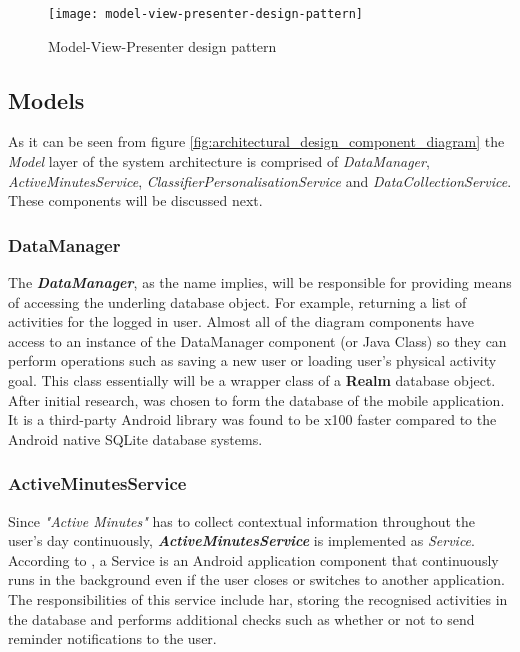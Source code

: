    \begin{figure}[ht]
        \centering
        \texttt{[image: model-view-presenter-design-pattern]}
        \caption{Model-View-Presenter design pattern \citep[28]{syromiatnikov2014}}
        \label{fig:model_view_presenter_design_pattern}
    \end{figure}
        
        \subsection{Models}
        As it can be seen from figure \ref{fig:architectural_design_component_diagram} the \textit{Model} layer of the system architecture is comprised of \textit{DataManager}, \textit{ActiveMinutesService}, \textit{ClassifierPersonalisationService} and \textit{DataCollectionService}. These components will be discussed next.
        
            \subsubsection{DataManager}
            The \textbf{\textit{DataManager}}, as the name implies, will be responsible for providing means of accessing the underling database object. For example, returning a list of activities for the logged in user. Almost all of the diagram components have access to an instance of the DataManager component (or Java Class) so they can perform operations such as saving a new user or loading user's physical activity goal. This class essentially will be a wrapper class of a \textbf{Realm} database object. After initial research, \citet{realm2014} was chosen to form the database of the mobile application. It is a third-party Android library was found to be x100 faster compared to the Android native SQLite database systems.
            
            \subsubsection{ActiveMinutesService}
            Since \textit{"Active Minutes"} has to collect contextual information throughout the user's day continuously, \textbf{\textit{ActiveMinutesService}} is implemented as \textit{Service}. According to \citet{googleservices2017}, a Service is an Android application component that continuously runs in the background even if the user closes or switches to another application. The responsibilities of this service include \gls{har}, storing the recognised activities in the database and performs additional checks such as whether or not to send reminder notifications to the user.
            

